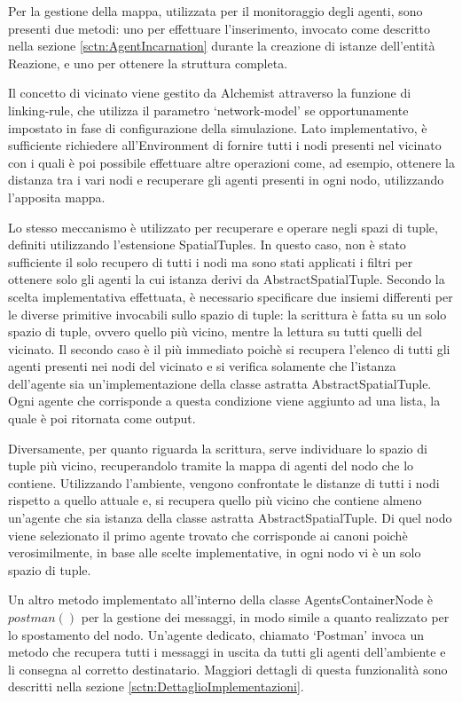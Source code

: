 Per la gestione della mappa, utilizzata per il monitoraggio degli agenti, sono presenti due metodi: uno per effettuare l'inserimento, invocato come descritto nella sezione \ref{sctn:AgentIncarnation} durante la creazione di istanze dell'entità Reazione, e uno per ottenere la struttura completa.

Il concetto di vicinato viene gestito da Alchemist attraverso la funzione di linking-rule, che utilizza il parametro `network-model' se opportunamente impostato in fase di configurazione della simulazione.
Lato implementativo, è sufficiente richiedere all'Environment di fornire tutti i nodi presenti nel vicinato con i quali è poi possibile effettuare altre operazioni come, ad esempio, ottenere la distanza tra i vari nodi e recuperare gli agenti presenti in ogni nodo, utilizzando l'apposita mappa.

Lo stesso meccanismo è utilizzato per recuperare e operare negli spazi di tuple, definiti utilizzando l'estensione SpatialTuples. In questo caso, non è stato sufficiente il solo recupero di tutti i nodi ma sono stati applicati i filtri per ottenere solo gli agenti la cui istanza derivi da AbstractSpatialTuple.
Secondo la scelta implementativa effettuata, è necessario specificare due insiemi differenti per le diverse primitive invocabili sullo spazio di tuple: la scrittura è fatta su un solo spazio di tuple, ovvero quello più vicino, mentre la lettura su tutti quelli del vicinato.
Il secondo caso è il più immediato poichè si recupera l'elenco di tutti gli agenti presenti nei nodi del vicinato e si verifica solamente che l'istanza dell'agente sia un'implementazione della classe astratta AbstractSpatialTuple. Ogni agente che corrisponde a questa condizione viene aggiunto ad una lista, la quale è poi ritornata come output.

Diversamente, per quanto riguarda la scrittura, serve individuare lo spazio di tuple più vicino, recuperandolo tramite la mappa di agenti del nodo che lo contiene. Utilizzando l'ambiente, vengono confrontate le distanze di tutti i nodi rispetto a quello attuale e, si recupera quello più vicino che contiene almeno un'agente che sia istanza della classe astratta AbstractSpatialTuple. Di quel nodo viene selezionato il primo agente trovato che corrisponde ai canoni poichè verosimilmente, in base alle scelte implementative, in ogni nodo vi è un solo spazio di tuple.

Un altro metodo implementato all'interno della classe AgentsContainerNode è $postman()$ per la gestione dei messaggi, in modo simile a quanto realizzato per lo spostamento del nodo. Un'agente dedicato, chiamato `Postman' invoca un metodo che recupera tutti i messaggi in uscita da tutti gli agenti dell'ambiente e li consegna al corretto destinatario. Maggiori dettagli di questa funzionalità sono descritti nella sezione \ref{sctn:DettaglioImplementazioni}.

